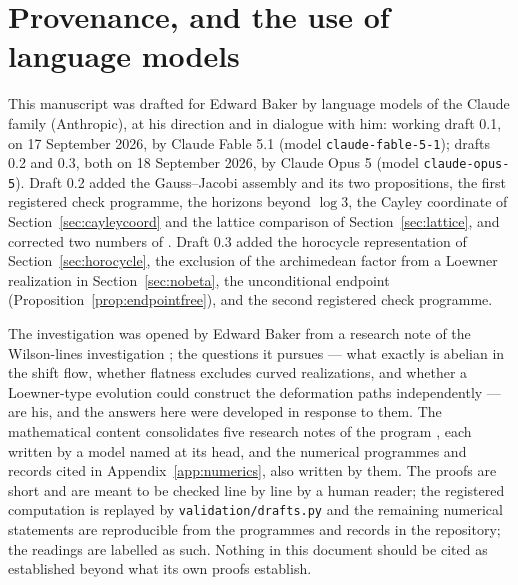 \section{Provenance, and the use of language models}\label{app:provenance}

This manuscript was drafted for Edward Baker by language models of the Claude
family (Anthropic), at his direction and in dialogue with him: working draft
0.1, on 17 September 2026, by Claude Fable 5.1 (model
\texttt{claude-fable-5-1}); drafts 0.2 and 0.3, both on 18 September 2026, by Claude
Opus 5 (model \texttt{claude-opus-5}). Draft 0.2 added the Gauss--Jacobi
assembly and its two propositions, the first registered check programme, the
horizons beyond $\log3$, the Cayley coordinate of
Section~\ref{sec:cayleycoord} and the lattice comparison of
Section~\ref{sec:lattice}, and corrected two numbers of \cite{ContractionNote}.
Draft 0.3 added the horocycle representation of
Section~\ref{sec:horocycle}, the exclusion of the archimedean factor from a
Loewner realization in Section~\ref{sec:nobeta}, the unconditional endpoint
(Proposition~\ref{prop:endpointfree}), and the second registered check
programme.

The investigation was opened by Edward Baker from a research note of the
Wilson-lines investigation \cite{LoewnerNote}; the questions it pursues --- what
exactly is abelian in the shift flow, whether flatness excludes curved
realizations, and whether a Loewner-type evolution could construct the
deformation paths independently --- are his, and the answers here were developed
in response to them. The mathematical content consolidates five research notes
of the program
\cite{LoewnerNote,OpeningNote,ContractionNote,RegisteredNote,HalfDimension},
each written by a model named at its head, and the numerical programmes and
records cited in Appendix~\ref{app:numerics}, also written by them. The proofs
are short and are meant to be checked line by line by a human reader; the
registered computation is replayed by \texttt{validation/drafts.py} and the
remaining numerical statements are reproducible from the programmes and records
in the repository; the readings are labelled as such. Nothing in this document
should be cited as established beyond what its own proofs establish.
